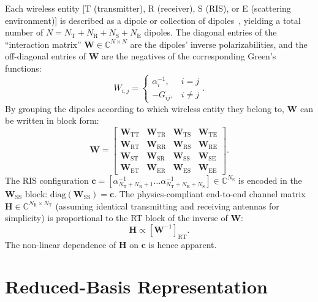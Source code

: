 \documentclass[journal,12pt,onecolumn,draftclsnofoot]{IEEEtran}
\begin{document}
Each wireless entity [T (transmitter), R (receiver), S (RIS), or E (scattering environment)] is described as a dipole or collection of dipoles~\cite{PhysFad}, yielding a total number of $N=N_{\mathrm{T}}+N_{\mathrm{R}}+N_{\mathrm{S}}+N_{\mathrm{E}}$ dipoles. 
The diagonal entries of the ``interaction matrix'' $\mathbf{W} \in \mathbb{C}^{N\times N}$ are the dipoles' inverse polarizabilities, and the off-diagonal entries of $\mathbf{W}$ are the negatives of the corresponding Green's functions:
\begin{equation}
W_{i,j}=\begin{cases}
\alpha_{i}^{-1}, & i=j\\
-G_{ij}, & i\neq j
\end{cases}.
\end{equation}
By grouping the dipoles according to which wireless entity they belong to, $\mathbf{W}$ can be written in block form:
\begin{equation}
\mathbf{W}=\begin{bmatrix}
\mathbf{W}_{\mathrm{TT}} & \mathbf{W}_{\mathrm{TR}} & \mathbf{W}_{\mathrm{TS}} & \mathbf{W}_{\mathrm{TE}}\\
\mathbf{W}_{\mathrm{RT}} & \mathbf{W}_{\mathrm{RR}} & \mathbf{W}_{\mathrm{RS}} & \mathbf{W}_{\mathrm{RE}}\\
\mathbf{W}_{\mathrm{ST}} & \mathbf{W}_{\mathrm{SR}} & \mathbf{W}_{\mathrm{SS}} & \mathbf{W}_{\mathrm{SE}}\\
\mathbf{W}_{\mathrm{ET}} & \mathbf{W}_{\mathrm{ER}} & \mathbf{W}_{\mathrm{ES}} & \mathbf{W}_{\mathrm{EE}}
\end{bmatrix}.
\end{equation}
The RIS configuration $\mathbf{c} = [ \alpha_{N_{\mathrm{T}}+N_{\mathrm{R}}+1}^{-1} \dots \alpha_{N_{\mathrm{T}}+N_{\mathrm{R}}+N_{\mathrm{S}}}^{-1} ] \in\mathbb{C}^{N_{\mathrm{S}}}$ is encoded in the $\mathbf{W}_\mathrm{SS}$ block: $\mathrm{diag}(\mathbf{W}_\mathrm{SS}) = \mathbf{c}$. 
The physics-compliant end-to-end channel matrix $\mathbf{H}\in\mathbb{C}^{N_{\mathrm{R}}\times N_{\mathrm{T}}}$ (assuming identical transmitting and receiving antennas  for simplicity) is proportional to the RT block of the inverse of $\mathbf{W}$:
\begin{equation}
    \mathbf{H} \propto [\mathbf{W}^{-1}]_{\mathrm{RT}}.
\label{eq:channeldef}
\end{equation}
The non-linear dependence of $\mathbf{H}$ on $\mathbf{c}$ is hence apparent.



\section{Reduced-Basis Representation}\label{sec_ReducedBasisRepresentation}
\end{document}
